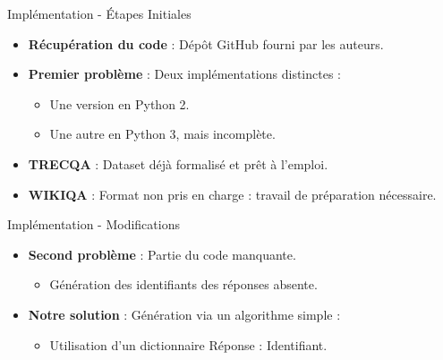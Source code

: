 \documentclass{beamer}
\begin{document}
\begin{frame}{Implémentation - Étapes Initiales}
  \begin{itemize}
    \item \textbf{Récupération du code} : Dépôt GitHub fourni par les auteurs.
    \item \textbf{Premier problème} : Deux implémentations distinctes :
    \begin{itemize}
      \item Une version en Python 2.
      \item Une autre en Python 3, mais incomplète.
    \end{itemize}
    \item \textbf{TRECQA} : Dataset déjà formalisé et prêt à l'emploi.
    \item \textbf{WIKIQA} : Format non pris en charge : travail de préparation nécessaire.
  \end{itemize}
\end{frame}

\begin{frame}{Implémentation - Modifications}
  \begin{itemize}
    \item \textbf{Second problème} : Partie du code manquante.
    \begin{itemize}
      \item Génération des identifiants des réponses absente.
    \end{itemize}
    \item \textbf{Notre solution} : Génération via un algorithme simple :
    \begin{itemize}
      \item Utilisation d'un dictionnaire Réponse : Identifiant.
    \end{itemize}
  \end{itemize}
\end{frame}
\end{document}
